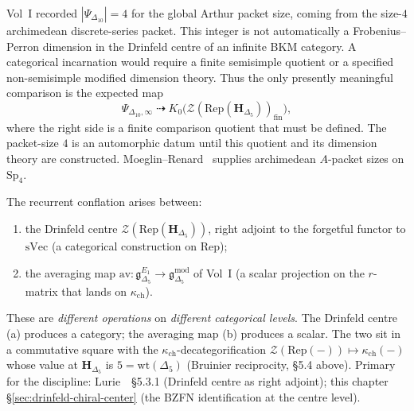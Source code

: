 \begin{remark}
\label{rem:dc-arch-fp-dim}
Vol~I \cite{VolI} recorded
$|\Psi_{\Delta_{10}}| = 4$ for the global Arthur packet size, coming
from the size-$4$ archimedean discrete-series packet. This integer is
not automatically a Frobenius--Perron dimension in the Drinfeld centre
of an infinite BKM category. A categorical incarnation would require a
finite semisimple quotient or a specified non-semisimple modified
dimension theory. Thus the only presently meaningful comparison is the
expected map
\begin{equation}
\label{eq:dc-fp-dimensions}
 \Psi_{\Delta_{10},\infty}
 \;\dashrightarrow\;
 K_0\bigl(\mathcal{Z}(\mathrm{Rep}(\mathbf{H}_{\Delta_5}))_{\mathrm{fin}}\bigr),
\end{equation}
where the right side is a finite comparison quotient that must be
defined. The packet-size \(4\) is an automorphic datum until this
quotient and its dimension theory are constructed. Moeglin--Renard~\cite{MoeglinRenard2018Paquets} supplies
archimedean $A$-packet sizes on $\mathrm{Sp}_4$.
\end{remark}

\begin{remark}
\label{rem:dc-nonconflation}
The recurrent conflation arises between:
\begin{enumerate}[label=(\alph*)]
 \item the Drinfeld centre
 $\mathcal{Z}(\mathrm{Rep}(\mathbf{H}_{\Delta_5}))$, right adjoint to
 the forgetful functor to $\mathrm{sVec}$ (a categorical construction
 on $\mathrm{Rep}$);
 \item the averaging map
 $\mathrm{av}\colon \mathfrak{g}^{E_1}_{\Delta_5} \to
 \mathfrak{g}^{\mathrm{mod}}_{\Delta_5}$
 of Vol~I (a scalar projection on the $r$-matrix that lands on
 $\kappa_{\mathrm{ch}}$).
\end{enumerate}
These are \emph{different
operations} on \emph{different categorical levels}. The Drinfeld
centre (a) produces a category; the averaging map (b) produces a
scalar. The two sit in a commutative square with the
$\kappa_{\mathrm{ch}}$-decategorification
$\mathcal{Z}(\mathrm{Rep}(-)) \mapsto \kappa_{\mathrm{ch}}(-)$ whose
value at $\mathbf{H}_{\Delta_5}$ is $5 = \mathrm{wt}(\Delta_5)$
(Bruinier reciprocity, \S5.4 above). Primary for the discipline:
Lurie~\cite{LurieHA}~\S5.3.1 (Drinfeld centre as right adjoint);
this chapter \S\ref{sec:drinfeld-chiral-center} (the BZFN
identification at the centre level).
\end{remark}


